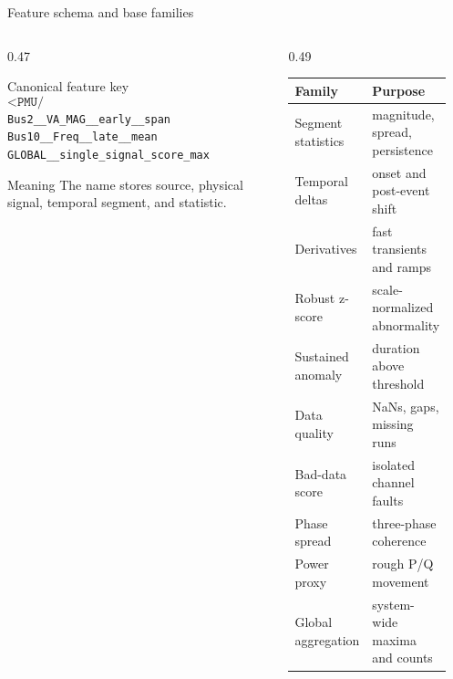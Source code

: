 \documentclass[aspectratio=169,10pt,t]{beamer}
\newcommand{\code}[1]{\texttt{\footnotesize #1}}
\begin{document}
\begin{frame}{Feature schema and base families}
\scriptsize
\begin{columns}[T,totalwidth=\textwidth]
\begin{column}{0.47\textwidth}
\begin{block}{Canonical feature key}
\[
\texttt{<PMU/BUS>\_\_<SIGNAL>\_\_<SEGMENT>\_\_<STAT>}
\]
\code{Bus2\_\_VA\_MAG\_\_early\_\_span}\\
\code{Bus10\_\_Freq\_\_late\_\_mean}\\
\code{GLOBAL\_\_single\_signal\_score\_max}
\end{block}
\begin{alertblock}{Meaning}
The name stores source, physical signal, temporal segment, and statistic.
\end{alertblock}
\end{column}
\begin{column}{0.49\textwidth}
\centering
\begin{tabular}{p{0.38\linewidth}p{0.50\linewidth}}
\toprule
\textbf{Family} & \textbf{Purpose}\\
\midrule
Segment statistics & magnitude, spread, persistence\\
Temporal deltas & onset and post-event shift\\
Derivatives & fast transients and ramps\\
Robust z-score & scale-normalized abnormality\\
Sustained anomaly & duration above threshold\\
Data quality & NaNs, gaps, missing runs\\
Bad-data score & isolated channel faults\\
Phase spread & three-phase coherence\\
Power proxy & rough P/Q movement\\
Global aggregation & system-wide maxima and counts\\
\bottomrule
\end{tabular}
\end{column}
\end{columns}
\end{frame}
\end{document}
